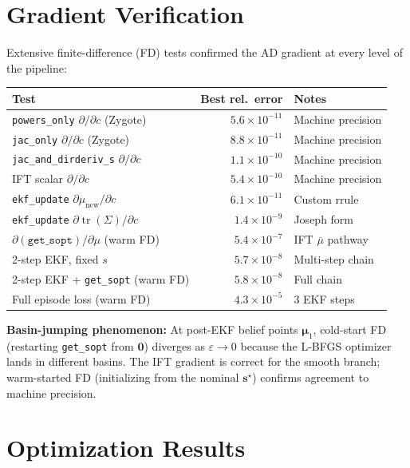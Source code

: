 \documentclass[11pt,a4paper]{article}
\newcommand{\tr}{\operatorname{tr}}
\begin{document}
\section{Gradient Verification}

Extensive finite-difference (FD) tests confirmed the AD gradient at every level of the pipeline:

\begin{center}
\begin{tabular}{@{}lrl@{}}
\toprule
Test & Best rel.\ error & Notes \\
\midrule
\texttt{powers\_only} $\partial/\partial c$ (Zygote) & $5.6 \times 10^{-11}$ & Machine precision \\
\texttt{jac\_only} $\partial/\partial c$ (Zygote) & $8.8 \times 10^{-11}$ & Machine precision \\
\texttt{jac\_and\_dirderiv\_s} $\partial/\partial c$ & $1.1 \times 10^{-10}$ & Machine precision \\
IFT scalar $\partial/\partial c$ & $5.4 \times 10^{-10}$ & Machine precision \\
\texttt{ekf\_update} $\partial \mu_{\text{new}}/\partial c$ & $6.1 \times 10^{-11}$ & Custom rrule \\
\texttt{ekf\_update} $\partial \tr(\Sigma)/\partial c$ & $1.4 \times 10^{-9}$ & Joseph form \\
$\partial(\texttt{get\_sopt})/\partial \mu$ (warm FD) & $5.4 \times 10^{-7}$ & IFT $\bar\mu$ pathway \\
2-step EKF, fixed $s$ & $5.7 \times 10^{-8}$ & Multi-step chain \\
2-step EKF + \texttt{get\_sopt} (warm FD) & $5.8 \times 10^{-8}$ & Full chain \\
Full episode loss (warm FD) & $4.3 \times 10^{-5}$ & 3 EKF steps \\
\bottomrule
\end{tabular}
\end{center}

\textbf{Basin-jumping phenomenon:} At post-EKF belief points $\bm{\mu}_1$, cold-start FD (restarting \texttt{get\_sopt} from $\bm{0}$) diverges as $\varepsilon \to 0$ because the L-BFGS optimizer lands in different basins.  The IFT gradient is correct for the smooth branch; warm-started FD (initializing from the nominal $\bm{s}^\star$) confirms agreement to machine precision.

\section{Optimization Results}
\end{document}
